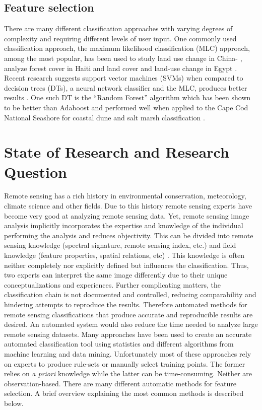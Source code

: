 \subsection{Feature selection}
There are many different classification approaches with varying degrees of
complexity and requiring different levels of user input. One commonly used
classification approach, the maximum likelihood classification (MLC) approach,
among the most popular, has been used to study land use change in China-
\citep{Ding2007}, analyze forest cover in Haiti \citep{Churches2014} and land
cover and land-use change in Egypt \citep{Shalaby2007}. Recent research suggests
support vector machines (SVMs) when compared to decision trees (DTs), a neural
network classifier and the MLC, produces better results \citep{Huang2002}. One
such DT is the ``Random Forest'' algorithm which has been shown to be better
than Adaboost \citep{Chan2008} and performed well when applied to the Cape Cod
National Seashore for coastal dune and salt marsh classification
\citep{Timm2012}.
\section{State of Research and Research Question}
Remote sensing has a rich history in environmental conservation, meteorology,
climate science and other fields. Due to this history remote sensing experts
have become very good at analyzing remote sensing data. Yet, remote sensing
image analysis implicitly incorporates the expertise and knowledge of the
individual performing the analysis and reduces objectivity. This can be divided
into remote sensing knowledge (spectral signature, remote sensing index, etc.)
and field knowledge (feature properties, spatial relations, etc)
\citep{Andres2013a}. This knowledge is often neither completely nor explicitly
defined but influences the classification. Thus, two experts can interpret the
same image differently due to their unique conceptualizations and experiences.
Further complicating matters, the classification chain is not documented and
controlled, reducing comparability and hindering attempts to reproduce the
results\citep{Arvor2013}. Therefore automated methods for remote sensing
classifications that produce accurate and reproducible results are desired.
An automated system would also reduce the time needed to analyze large
remote sensing datasets. Many approaches have been used to create an accurate
automated classification tool using statistics and different algorithms
from machine learning and data mining. Unfortunately most of these approaches
rely on experts to produce rule-sets or manually select training points. The
former relies on \emph{a priori} knowledge while the latter can be
time-consuming.
Neither are observation-based. There are many different automatic methods
for feature selection. A brief overview explaining the most common methods is
described below.


